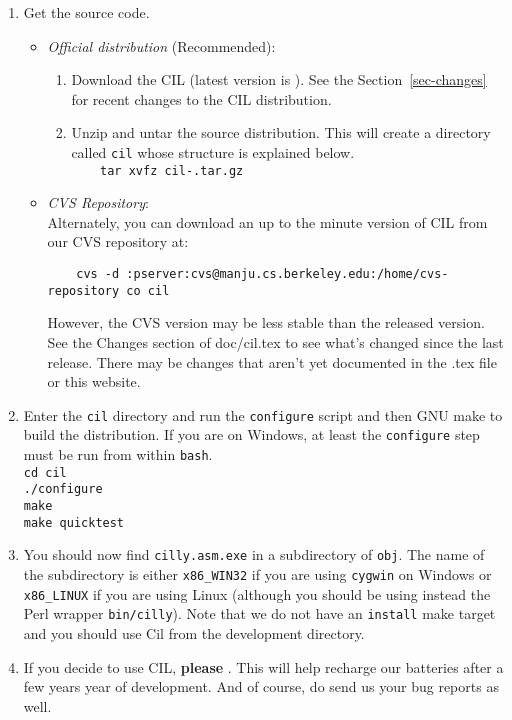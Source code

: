 \documentclass{article}
\def\secref#1{Section~\ref{sec-#1}}
\newcommand{\hsp}{\hspace{0.5in}}
\def\t#1{{\tt #1}}
\begin{document}
\begin{enumerate}
\item Get the source code.
\begin{itemize}
\item {\em Official distribution} (Recommended):
\begin{enumerate}
\item Download the CIL  (latest version is
). See the \secref{changes} for recent changes to the CIL distribution.
\item Unzip and untar the source distribution. This will create a directory
      called \t{cil} whose structure is explained below. \\
      \t{~~~~tar xvfz cil-\cilversion.tar.gz}
\end{enumerate}
\item {\em CVS Repository}: \\
  Alternately, you can download an up to the minute version of CIL
  from our CVS repository at:
\begin{verbatim}
    cvs -d :pserver:cvs@manju.cs.berkeley.edu:/home/cvs-repository co cil
\end{verbatim}
However, the CVS version may be less stable than the released
version.  See the Changes section of doc/cil.tex to see what's
changed since the last release.  There may be changes that aren't yet
documented in the .tex file or this website.

\end{itemize}
\item Enter the \t{cil} directory and run the \t{configure} script and then 
      GNU make to build the distribution. If you are on Windows, at least the
      \t{configure} step must be run from within \t{bash}. \\
      \hsp\verb!cd cil!\\
      \hsp\verb!./configure!\\
      \hsp\verb!make!\\
      \hsp\verb!make quicktest!\\

\item You should now find \t{cilly.asm.exe} in a subdirectory of \t{obj}. The
name of the subdirectory is either \t{x86\_WIN32} if you are using \t{cygwin}
on Windows or \t{x86\_LINUX} if you are using Linux (although you should be
using instead the Perl wrapper \t{bin/cilly}). Note that we do not have an
\t{install} make target and you should use Cil from the development directory.
\item If you decide to use CIL, {\bf please}
. This will help recharge
our batteries after a few years year of development. And of course, do send us
your bug reports as well.
\end{enumerate}
\end{document}
